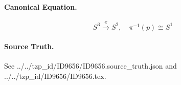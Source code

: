 \paragraph{Canonical Equation.}
\[
S^3 \xrightarrow{\pi} S^2, \quad \pi^{-1}(p) \cong S^1
\]

\paragraph{Source Truth.}
See ../../tzp\_id/ID9656/ID9656.source\_truth.json and ../../tzp\_id/ID9656/ID9656.tex.

